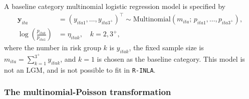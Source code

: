 \documentclass[a4paper, nobind]{templates/ociamthesis}
\newcommand{\y}{\mathbf{y}}
\begin{document}
A baseline category multinomial logistic regression model is specified by
\begin{align}
    \y_{ita} &= (y_{ita1}, \ldots, y_{ita3^{+}})^\top \sim \text{Multinomial}(m_{ita}; \, p_{ita1}, \ldots, p_{ita3^{+}}), \\
    \log \left( \frac{p_{itak}}{p_{ita1}} \right) &= \eta_{itak}, \quad k = 2, 3^{+},
\end{align}
where the number in risk group \(k\) is \(y_{itak}\), the fixed sample size is \(m_{ita} = \sum_{k = 1}^{3^{+}} y_{itak}\), and \(k = 1\) is chosen as the baseline category.
This model is not an LGM, and is not possible to fit in \texttt{R-INLA}.

\hypertarget{the-multinomial-poisson-transformation}{%
\subsubsection{The multinomial-Poisson transformation}\label{the-multinomial-poisson-transformation}}
\end{document}
